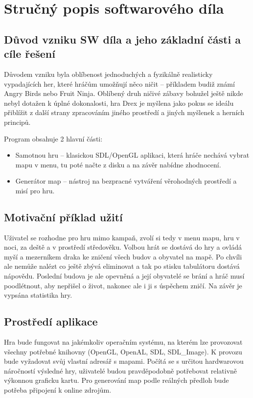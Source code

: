 \documentclass{article}
\begin{document}
\section{Stručný popis softwarového díla}

\subsection{Důvod vzniku SW díla a jeho základní části a cíle řešení}

Důvodem vzniku byla oblíbenost jednoduchých a fyzikálně realisticky
vypadajících her, které hráčům umožňují něco ničit -- příkladem budiž známí
Angry Birds nebo Fruit Ninja. Oblíbený druh ničivé zábavy bohužel ještě nikde
nebyl dotažen k úplné dokonalosti, hra Drex je myšlena jako pokus se
ideálu přiblížit z další strany zpracováním jiného prostředí a jiných myšlenek
a herních principů.

Program obsahuje 2 hlavní části:

\begin{itemize}
\item Samotnou hru -- klasickou SDL/OpenGL aplikaci, která hráče nechává vybrat mapu v menu, tu poté načte z disku a na závěr nabídne zhodnocení. 
\item Generátor map -- nástroj na bezpracné vytváření věrohodných prostředí a misí pro hru.
\end{itemize}

\subsection{Motivační příklad užití}

Uživatel se rozhodne pro hru mimo kampaň, zvolí si tedy v menu mapu, hru v noci, za deště a v prostředí středověku. Volbou hrát se dostává do hry a ovládá myší a mezerníkem draka ke zničení všech budov a obyvatel na mapě. Po chvíli ale nemůže nalézt co ještě zbývá eliminovat a tak po stisku tabulátoru dostává nápovědu. Poslední budova je ale opevněná a její obyvatelé se brání a hráč musí poodlétnout, aby nepřišel o život, nakonec ale i ji s úspěchem zničí. Na závěr je vypsána statistika hry.

\subsection{Prostředí aplikace}

Hra bude fungovat na jakémkoliv operačním systému, na kterém lze provozovat všechny potřebné knihovny (OpenGL, OpenAL, SDL, SDL\_Image). K provozu bude vyžadovat svůj vlastní adresář s mapami. Počítá se s určitou hardwarovou náročností výsledné hry, uživatelé budou pravděpodobně potřebovat relativně výkonnou graficku kartu. Pro generování map podle reálných předloh bude potřeba připojení k online zdrojům.
\end{document}
